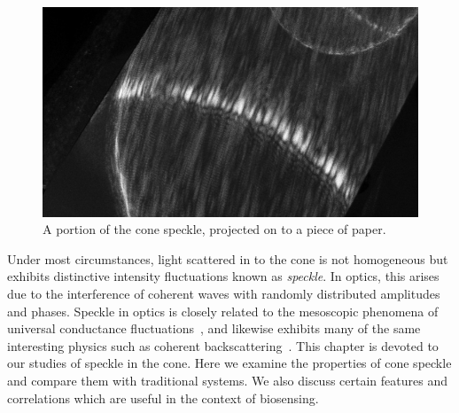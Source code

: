 \begin{figure}[ht]
\centering
\includegraphics[keepaspectratio,width=15cm]{speckle/figures/Ag_LaSFN9_cone_lens11_cam-8899.jpg}
\caption{A portion of the cone speckle, projected on to a piece of paper.}
\label{fig:examplespeckle}
\end{figure}

Under most circumstances, light scattered in to the cone is not homogeneous
but exhibits distinctive intensity fluctuations known as \textit{speckle}.
In optics, this arises due to the interference of coherent waves with
randomly distributed amplitudes and phases.  Speckle in optics is closely
related to the mesoscopic phenomena of universal conductance
fluctuations~\cite{lee1985universal}, and likewise exhibits many of the
same interesting physics such as coherent
backscattering~\cite{akkermans1986coherent}.  This chapter is devoted to
our studies of speckle in the cone.  Here we examine the properties of cone
speckle and compare them with traditional systems.  We also discuss certain
features and correlations which are useful in the context of biosensing.
